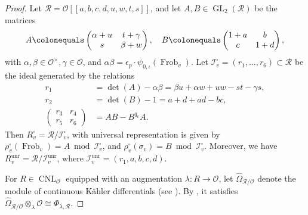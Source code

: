 \documentclass[a4paper, notitlepage, 10pt]{amsart}
\theoremstyle{plain} %
\theoremstyle{definition} %
\theoremstyle{remark} %
\numberwithin{equation}{section}
\newcommand{\GL}{\operatorname{GL}} %
\newcommand{\CNL}{\operatorname{CNL}}
\newcommand{\Frob}{\operatorname{Frob}} %
\newcommand{\unr}{\operatorname{unr}}
\begin{document}
\begin{proof}
    Let $\mathcal{R}=\mathcal{O}[[a,b,c,d,u,w,t,s]]$, and let $A,B\in \GL_2(\mathcal{R})$ be the matrices
    $$ A\colonequals \begin{pmatrix}
        \alpha+u & t+\gamma \\ s & \beta+w \\ 
    \end{pmatrix}, \quad B\colonequals \begin{pmatrix}
        1+a & b \\ c & 1+d
    \end{pmatrix}, $$
    with $\alpha,\beta\in \mathcal{O}^\times,\gamma\in \mathcal{O}$, and  $\alpha\beta=\epsilon_p\cdot\psi_{0,\iota}(\Frob_v)$. Let $\mathcal{I}^\square_v=(r_1,\dots,r_6)\subset \mathcal{R}$ be the ideal generated by the relations 
    \begin{align*}
        r_1&=\det(A)-\alpha\beta= \beta u+\alpha w+uw-st-\gamma s,
        \\  r_2&=\det(B)-1=a+d+ad-bc,
        \\ \begin{pmatrix}
            r_3 & r_4
            \\ r_5 & r_6
        \end{pmatrix}&=AB-B^{q_v} A.
    \end{align*}
    Then $R^{\square}_v=\mathcal{R}/\mathcal{I}^{\square}_v$, with universal representation is given by $\rho^{\square}_v(\Frob_v)= A \bmod \mathcal{I}^{\square}_v$, and $\rho^{\square}_v(\sigma_v)= B \bmod \mathcal{I}^{\square}_v$. Moreover, we have  $R^{\unr}_v=\mathcal{R}/\mathcal{I}^{\unr}_v$, where $\mathcal{I}^{\unr}_v=(r_1,a,b,c,d)$. 

    For $R\in \CNL_{\mathcal{O}}$ equipped with an augmentation $\lambda\colon R\to \mathcal{O}$, let $\widehat{\Omega}_{\mathcal{R}/\mathcal{O}}$ denote the module of continuous Kähler differentials (see \cite[\S 7.1]{BKM1}). By \cite[Lemma 7.3]{BKM1}, it satisfies $\widehat{\Omega}_{\mathcal{R}/\mathcal{O}}\otimes_{\lambda}\mathcal{O}\cong \Phi_{\lambda,\mathcal{R}}$.
    

\end{proof}
\end{document}
